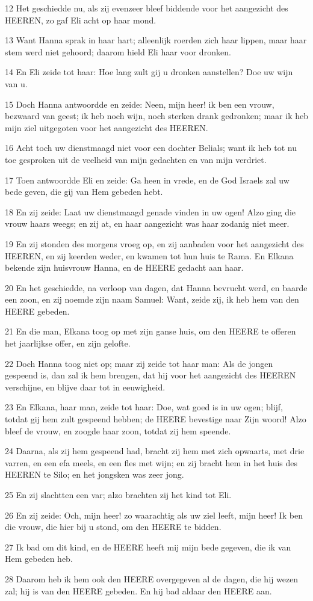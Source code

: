 \par 12 Het geschiedde nu, als zij evenzeer bleef biddende voor het aangezicht des HEEREN, zo gaf Eli acht op haar mond.
\par 13 Want Hanna sprak in haar hart; alleenlijk roerden zich haar lippen, maar haar stem werd niet gehoord; daarom hield Eli haar voor dronken.
\par 14 En Eli zeide tot haar: Hoe lang zult gij u dronken aanstellen? Doe uw wijn van u.
\par 15 Doch Hanna antwoordde en zeide: Neen, mijn heer! ik ben een vrouw, bezwaard van geest; ik heb noch wijn, noch sterken drank gedronken; maar ik heb mijn ziel uitgegoten voor het aangezicht des HEEREN.
\par 16 Acht toch uw dienstmaagd niet voor een dochter Belials; want ik heb tot nu toe gesproken uit de veelheid van mijn gedachten en van mijn verdriet.
\par 17 Toen antwoordde Eli en zeide: Ga heen in vrede, en de God Israels zal uw bede geven, die gij van Hem gebeden hebt.
\par 18 En zij zeide: Laat uw dienstmaagd genade vinden in uw ogen! Alzo ging die vrouw haars weegs; en zij at, en haar aangezicht was haar zodanig niet meer.
\par 19 En zij stonden des morgens vroeg op, en zij aanbaden voor het aangezicht des HEEREN, en zij keerden weder, en kwamen tot hun huis te Rama. En Elkana bekende zijn huisvrouw Hanna, en de HEERE gedacht aan haar.
\par 20 En het geschiedde, na verloop van dagen, dat Hanna bevrucht werd, en baarde een zoon, en zij noemde zijn naam Samuel: Want, zeide zij, ik heb hem van den HEERE gebeden.
\par 21 En die man, Elkana toog op met zijn ganse huis, om den HEERE te offeren het jaarlijkse offer, en zijn gelofte.
\par 22 Doch Hanna toog niet op; maar zij zeide tot haar man: Als de jongen gespeend is, dan zal ik hem brengen, dat hij voor het aangezicht des HEEREN verschijne, en blijve daar tot in eeuwigheid.
\par 23 En Elkana, haar man, zeide tot haar: Doe, wat goed is in uw ogen; blijf, totdat gij hem zult gespeend hebben; de HEERE bevestige naar Zijn woord! Alzo bleef de vrouw, en zoogde haar zoon, totdat zij hem speende.
\par 24 Daarna, als zij hem gespeend had, bracht zij hem met zich opwaarts, met drie varren, en een efa meels, en een fles met wijn; en zij bracht hem in het huis des HEEREN te Silo; en het jongsken was zeer jong.
\par 25 En zij slachtten een var; alzo brachten zij het kind tot Eli.
\par 26 En zij zeide: Och, mijn heer! zo waarachtig als uw ziel leeft, mijn heer! Ik ben die vrouw, die hier bij u stond, om den HEERE te bidden.
\par 27 Ik bad om dit kind, en de HEERE heeft mij mijn bede gegeven, die ik van Hem gebeden heb.
\par 28 Daarom heb ik hem ook den HEERE overgegeven al de dagen, die hij wezen zal; hij is van den HEERE gebeden. En hij bad aldaar den HEERE aan.

